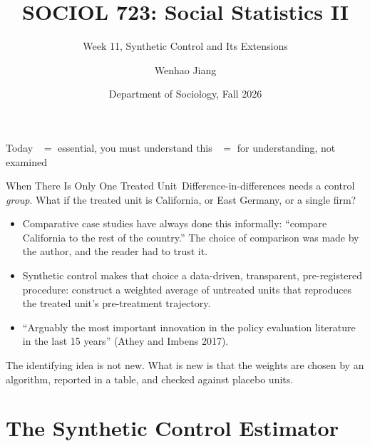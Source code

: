 \documentclass[aspectratio=169,11pt,xcolor=dvipsnames]{beamer}
\title[SOCIOL 723]{SOCIOL 723: Social Statistics II\\[-2pt]}
\subtitle{Week 11, Synthetic Control and Its Extensions\\[-6pt]}
\author[Jiang]{Wenhao Jiang\vspace{-2.5em}}
\institute[Duke]{}
\date{Department of Sociology, Fall 2026}
\newcommand{\srcp}[1]{{\scriptsize\color{gray}(#1)}}
\newcommand{\adv}{\,\raisebox{0.6pt}{\textcolor{accent}{$\bigstar$}}}
\newcommand{\core}{\,\raisebox{0.6pt}{\textcolor{corestar}{$\bigstar$}}}
\begin{document}
\begin{frame}[plain]
  \titlepage
\end{frame}

\begin{frame}{Today}
  \tableofcontents
  \vskip6pt
  {\footnotesize \core{} $=$ essential, you must understand this \quad\quad \adv{} $=$ for understanding, not examined}
\end{frame}

\begin{frame}{When There Is Only One Treated Unit\core}
Difference-in-differences needs a control \emph{group}. What if the treated unit
is California, or East Germany, or a single firm?
\vskip4pt
\begin{itemize}\itemsep3pt
  \item Comparative case studies have always done this informally: ``compare
        California to the rest of the country.'' The choice of comparison was
        made by the author, and the reader had to trust it.
  \item \alert{Synthetic control} makes that choice a data-driven, transparent,
        pre-registered procedure: construct a weighted average of untreated units
        that reproduces the treated unit's pre-treatment trajectory.
  \item ``Arguably the most important innovation in the policy evaluation
        literature in the last 15 years'' \srcp{Athey and Imbens 2017}.
\end{itemize}
\vskip4pt
The identifying idea is not new. What is new is that the weights are chosen by an
algorithm, reported in a table, and checked against placebo units.
\end{frame}

\section[Synthetic Control]{The Synthetic Control Estimator}
\begin{frame}\sectionpage\end{frame}
\end{document}

